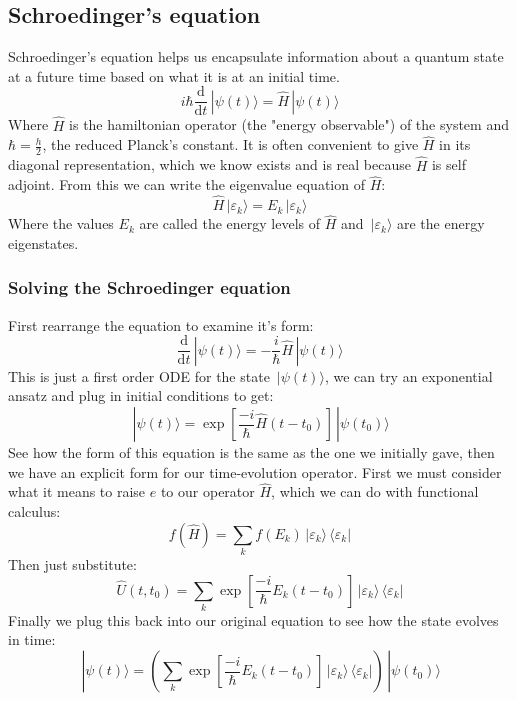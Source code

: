 \documentclass[12pt]{article}
\newcommand{\df}[2]{\frac{\text{d}#1}{\text{d}#2}}
\newcommand{\ket}[1]{\,|#1\rangle}
\newcommand{\bra}[1]{\,\langle #1|}
\begin{document}
\subsection*{Schroedinger's equation}
Schroedinger's equation helps us encapsulate information about a quantum state at a future time based on what it is at an initial time.
\[i\hbar\df{}{t}\ket{\psi(t)}=\hat{H}\ket{\psi(t)}\]
Where \(\hat{H}\) is the hamiltonian operator (the "energy observable") of the system and \(\hbar=\frac{h}{2}\), the reduced Planck's constant. It is often convenient to give \(\hat{H}\) in its diagonal representation, which we know exists and is real because \(\hat{H}\) is self adjoint. From this we can write the eigenvalue equation of \(\hat{H}\):
\[\hat{H}\ket{\varepsilon_k}=E_k\ket{\varepsilon_k}\]
Where the values \(E_k\) are called the energy levels of \(\hat{H}\) and \(\ket{\varepsilon_k}\) are the energy eigenstates.
\subsubsection*{Solving the Schroedinger equation}
First rearrange the equation to examine it's form:
\[\df{}{t}\ket{\psi(t)}=-\frac{i}{\hbar}\hat{H}\ket{\psi(t)}\]
This is just a first order ODE for the state \(\ket{\psi(t)}\), we can try an exponential ansatz and plug in initial conditions to get:
\[\ket{\psi(t)}=\exp\left[\frac{-i}{\hbar}\hat{H}(t-t_0)\right]\ket{\psi(t_0)}\]
See how the form of this equation is the same as the one we initially gave, then we have an explicit form for our time-evolution operator. First we must consider what it means to raise \(e\) to our operator \(\hat{H}\), which we can do with functional calculus:
\[f(\hat{H})=\sum_kf(E_k)\ket{\varepsilon_k}\bra{\varepsilon_k}\]
Then just substitute:
\[\hat{U}(t,t_0)=\sum_k\exp\left[\frac{-i}{\hbar}E_k(t-t_0)\right]\ket{\varepsilon_k}\bra{\varepsilon_k}\]
Finally we plug this back into our original equation to see how the state evolves in time:
\[\ket{\psi(t)}=\left(\sum_k\exp\left[\frac{-i}{\hbar}E_k(t-t_0)\right]\ket{\varepsilon_k}\bra{\varepsilon_k}\right)\ket{\psi(t_0)}\]
\end{document}
